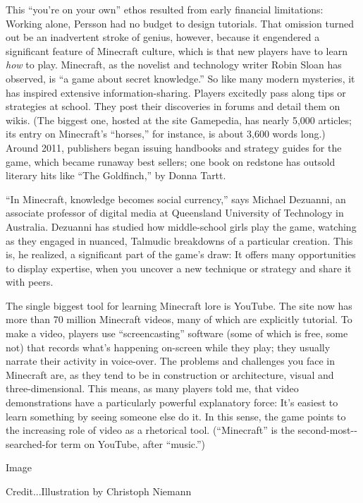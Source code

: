 This ``you're on your own'' ethos resulted from early financial
limitations: Working alone, Persson had no budget to design tutorials.
That omission turned out be an inadvertent stroke of genius, however,
because it engendered a significant feature of Minecraft culture, which
is that new players have to learn \emph{how} to play. Minecraft, as the
novelist and technology writer Robin Sloan has observed, is ``a game
about secret knowledge.'' So like many modern mysteries, it has inspired
extensive information-­­sharing. Players excitedly pass along tips or
strategies at school. They post their discoveries in forums and detail
them on wikis. (The biggest one, hosted at the site Gamepedia, has
nearly 5,000 articles; its entry on Minecraft's ``horses,'' for
instance, is about 3,600 words long.) Around 2011, publishers began
issuing handbooks and strategy guides for the game, which became runaway
best sellers; one book on redstone has outsold literary hits like ``The
Goldfinch,'' by Donna Tartt.

``In Minecraft, knowledge becomes social currency,'' says Michael
Dezuanni, an associate professor of digital media at Queensland
University of Technology in Australia. Dezuanni has studied how
middle-­school girls play the game, watching as they engaged in nuanced,
Talmudic breakdowns of a particular creation. This is, he realized, a
significant part of the game's draw: It offers many opportunities to
display expertise, when you uncover a new technique or strategy and
share it with peers.

The single biggest tool for learning Minecraft lore is YouTube. The site
now has more than 70 million Minecraft videos, many of which are
explicitly tutorial. To make a video, players use ``screencasting''
software (some of which is free, some not) that records what's happening
on-screen while they play; they usually narrate their activity in
voice-­over. The problems and challenges you face in Minecraft are, as
they tend to be in construction or architecture, visual and
three-­dimensional. This means, as many players told me, that video
demonstrations have a particularly powerful explanatory force: It's
easiest to learn something by seeing someone else do it. In this sense,
the game points to the increasing role of video as a rhetorical tool.
(``Minecraft'' is the second-­most-­searched-­for term on YouTube, after
``music.'')

Image

Credit...Illustration by Christoph Niemann

